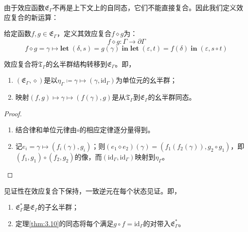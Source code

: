 由于效应函数$\mathfrak{E}_\Gamma$不再是上下文上的自同态，它们不能直接复合。因此我们定义效应复合的新运算：

\begin{definition}\label{def:3.9}
给定函数$f, g \in \mathfrak{E}_\Gamma$，定义其效应复合$f \diamond g$为：
\begin{equation}\label{eq:3.13}
f \diamond g : \Gamma \to \partial\Gamma
\end{equation}
\[
f \diamond g = \gamma \mapsto \mathbf{let}\;(\delta, s) = g(\gamma)\;\mathbf{in}\;\mathbf{let}\;(\varepsilon, t) = f(\delta)\;\mathbf{in}\;(\varepsilon, s \circ t)
\]
\end{definition}

\begin{theorem}\label{thm:3.10}
效应复合将$\mathfrak{T}_\Gamma$的幺半群结构转移到$\mathfrak{E}_\Gamma$。即，
\begin{enumerate}
\item $(\mathfrak{E}_\Gamma, \diamond)$是以$\eta_\Gamma \coloneqq \gamma \mapsto (\gamma, \mathrm{id}_\Gamma)$为单位元的幺半群；
\item 映射$(f, g) \mapsto \gamma \mapsto (f(\gamma), g)$是从$\mathfrak{T}_\Gamma$到$\mathfrak{E}_\Gamma$的幺半群同态。
\end{enumerate}
\end{theorem}

\begin{proof}
\begin{enumerate}
\item 结合律和单位元律由$\circ$的相应定律逐分量得到。
\item 记$e_i = \gamma \mapsto (f_i(\gamma), g_i)$；则$(e_1 \diamond e_2)(\gamma) = (f_1(f_2(\gamma)), g_2 \circ g_1)$，即$(f_1, g_1) \circ (f_2, g_2)$的像，而$(\mathrm{id}_\Gamma, \mathrm{id}_\Gamma)$映射到$\eta_\Gamma$。
\end{enumerate}
\end{proof}

\begin{theorem}\label{thm:3.11}
见证性在效应复合下保持，一致逆元在每个状态见证。即，
\begin{enumerate}
\item $\mathfrak{E}^*_\Gamma$是$\mathfrak{E}_\Gamma$的子幺半群；
\item 定理\ref{thm:3.10}的同态将每个满足$g \circ f = \mathrm{id}_\Gamma$的对带入$\mathfrak{E}^*_\Gamma$。
\end{enumerate}
\end{theorem}

